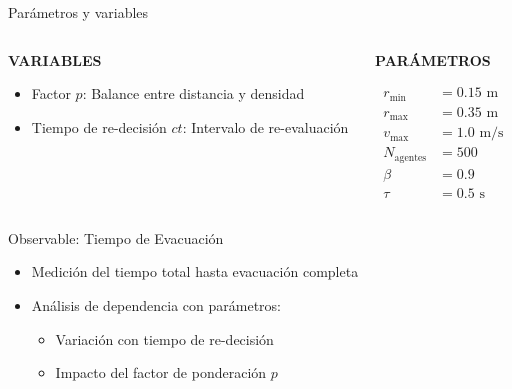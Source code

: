 \documentclass[aspectratio=169]{beamer}
\begin{document}
\begin{frame}{Parámetros y variables}
    \begin{columns}
        \begin{column}{0.5\textwidth}
            {\centering\textbf{VARIABLES}\par}
            \vspace{0.5em}
            \begin{itemize}
                \item Factor $p$: Balance entre distancia y densidad
                \item Tiempo de re-decisión $ct$: Intervalo de re-evaluación
            \end{itemize}
        \end{column}
        \begin{column}{0.5\textwidth}
            {\centering\textbf{PARÁMETROS}\par}
            \vspace{0.5em}
            \begin{align*}
                r_{\text{min}} &= 0.15\text{ m} \\
                r_{\text{max}} &= 0.35\text{ m} \\
                v_{\text{max}} &= 1.0\text{ m/s} \\
                N_{\text{agentes}} &= 500 \\
                \beta &= 0.9 \\
                \tau &= 0.5\text{ s}
            \end{align*}
        \end{column}
    \end{columns}
\end{frame}

\begin{frame}{Observable: Tiempo de Evacuación}
    \begin{itemize}
        \item Medición del tiempo total hasta evacuación completa
        \item Análisis de dependencia con parámetros:
        \begin{itemize}
            \item Variación con tiempo de re-decisión
            \item Impacto del factor de ponderación $p$
        \end{itemize}
    \end{itemize}
\end{frame}
\end{document}
